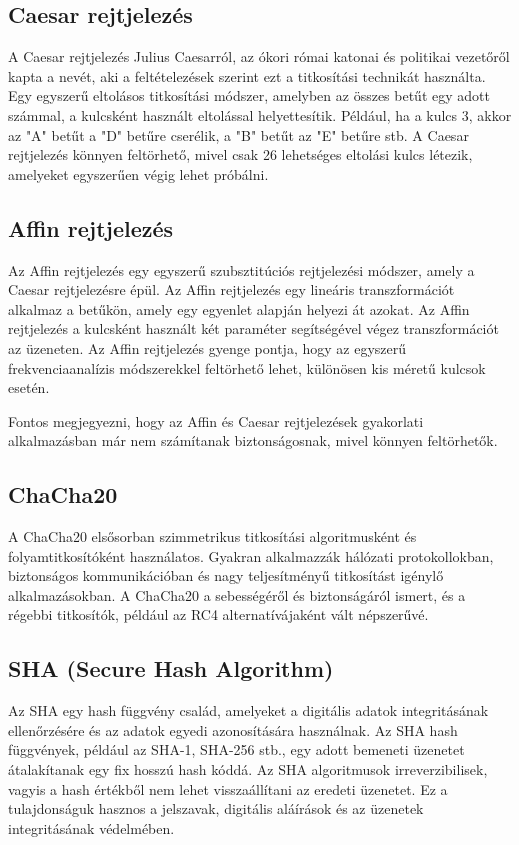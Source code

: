 \subsection {Caesar rejtjelezés}
A Caesar rejtjelezés Julius Caesarról, az ókori római katonai és politikai vezetőről kapta a nevét, aki a feltételezések szerint ezt a titkosítási technikát használta. Egy egyszerű eltolásos titkosítási módszer, amelyben az összes betűt egy adott számmal, a kulcsként használt eltolással helyettesítik. Például, ha a kulcs 3, akkor az "A" betűt a "D" betűre cserélik, a "B" betűt az "E" betűre stb. A Caesar rejtjelezés könnyen feltörhető, mivel csak 26 lehetséges eltolási kulcs létezik, amelyeket egyszerűen végig lehet próbálni.

\subsection {Affin rejtjelezés}
Az Affin rejtjelezés egy egyszerű szubsztitúciós rejtjelezési módszer, amely a Caesar rejtjelezésre épül. Az Affin rejtjelezés egy lineáris transzformációt alkalmaz a betűkön, amely egy egyenlet alapján helyezi át azokat. Az Affin rejtjelezés a kulcsként használt két paraméter segítségével végez transzformációt az üzeneten. Az Affin rejtjelezés gyenge pontja, hogy az egyszerű frekvenciaanalízis módszerekkel feltörhető lehet, különösen kis méretű kulcsok esetén.

\vspace{10pt}
Fontos megjegyezni, hogy az Affin és Caesar rejtjelezések gyakorlati alkalmazásban már nem számítanak biztonságosnak, mivel könnyen feltörhetők.

\subsection {ChaCha20}
A ChaCha20 elsősorban szimmetrikus titkosítási algoritmusként és folyamtitkosítóként használatos. Gyakran alkalmazzák hálózati protokollokban, biztonságos kommunikációban és nagy teljesítményű titkosítást igénylő alkalmazásokban. A ChaCha20 a sebességéről és biztonságáról ismert, és a régebbi titkosítók, például az RC4 alternatívájaként vált népszerűvé.

\newpage
\subsection {SHA (Secure Hash Algorithm)}
 Az SHA egy hash függvény család, amelyeket a digitális adatok integritásának ellenőrzésére és az adatok egyedi azonosítására használnak. Az SHA hash függvények, például az SHA-1, SHA-256 stb., egy adott bemeneti üzenetet átalakítanak egy fix hosszú hash kóddá. Az SHA algoritmusok irreverzibilisek, vagyis a hash értékből nem lehet visszaállítani az eredeti üzenetet. Ez a tulajdonságuk hasznos a jelszavak, digitális aláírások és az üzenetek integritásának védelmében.

